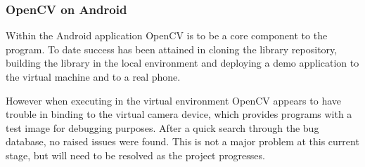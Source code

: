 \subsubsection*{OpenCV on Android}
Within the Android application OpenCV is to be a core component to the program. To date success has been attained in cloning the library repository, building the library in the local environment and deploying a demo application to the virtual machine and to a real phone.

However when executing in the virtual environment OpenCV appears to have trouble in binding to the virtual camera device, which provides programs with a test image for debugging purposes. After a quick search through the bug database, no raised issues were found. This is not a major problem at this current stage, but will need to be resolved as the project progresses.
